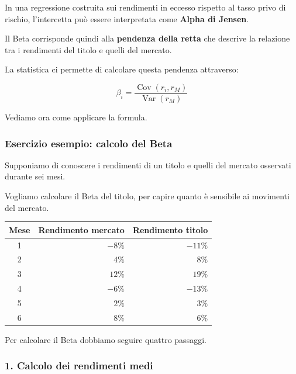 \noindent In una regressione costruita sui
rendimenti in eccesso rispetto al tasso privo
di rischio, l'intercetta può essere interpretata
come \textbf{Alpha di Jensen}.

\medskip

\noindent Il Beta corrisponde quindi
alla \textbf{pendenza della retta}
che descrive la relazione tra i rendimenti
del titolo e quelli del mercato.

\medskip

\noindent La statistica ci permette di calcolare
questa pendenza attraverso:

\[
\boxed{
\beta_i=
\frac{\operatorname{Cov}(r_i,r_M)}
{\operatorname{Var}(r_M)}
}
\]

\noindent Vediamo ora come applicare la formula.


\subsubsection*{Esercizio esempio: calcolo del Beta}

\noindent Supponiamo di conoscere i rendimenti
di un titolo e quelli del mercato
osservati durante sei mesi.

\medskip

\noindent Vogliamo calcolare il Beta del titolo,
per capire quanto è sensibile
ai movimenti del mercato.

\begin{center}
\small
\begin{tabular}{|c|r|r|}
\hline
\textbf{Mese} &
\textbf{Rendimento mercato} &
\textbf{Rendimento titolo} \\
\hline
1 & $-8\%$ & $-11\%$ \\
\hline
2 & $4\%$ & $8\%$ \\
\hline
3 & $12\%$ & $19\%$ \\
\hline
4 & $-6\%$ & $-13\%$ \\
\hline
5 & $2\%$ & $3\%$ \\
\hline
6 & $8\%$ & $6\%$ \\
\hline
\end{tabular}
\end{center}

\noindent Per calcolare il Beta dobbiamo
seguire quattro passaggi.


\subsubsection*{1. Calcolo dei rendimenti medi}


